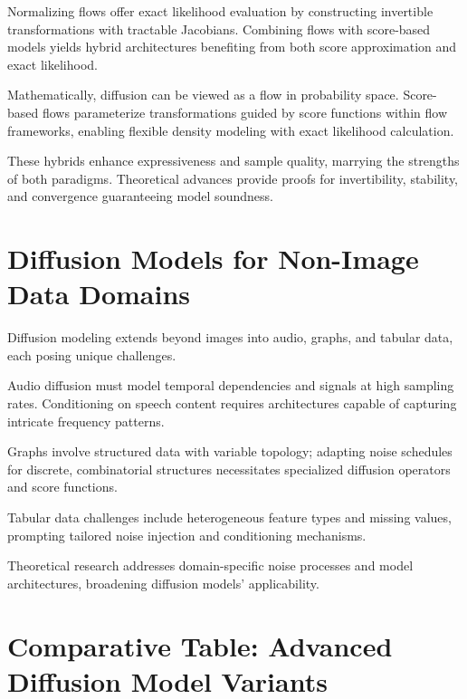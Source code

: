 \documentclass[a4paper,12pt,oneside]{memoir}
\begin{document}
Normalizing flows offer exact likelihood evaluation by constructing invertible transformations with tractable Jacobians. Combining flows with score-based models yields hybrid architectures benefiting from both score approximation and exact likelihood.

Mathematically, diffusion can be viewed as a flow in probability space. Score-based flows parameterize transformations guided by score functions within flow frameworks, enabling flexible density modeling with exact likelihood calculation.

These hybrids enhance expressiveness and sample quality, marrying the strengths of both paradigms. Theoretical advances provide proofs for invertibility, stability, and convergence guaranteeing model soundness.

\section{Diffusion Models for Non-Image Data Domains}

Diffusion modeling extends beyond images into audio, graphs, and tabular data, each posing unique challenges.

Audio diffusion must model temporal dependencies and signals at high sampling rates. Conditioning on speech content requires architectures capable of capturing intricate frequency patterns.

Graphs involve structured data with variable topology; adapting noise schedules for discrete, combinatorial structures necessitates specialized diffusion operators and score functions.

Tabular data challenges include heterogeneous feature types and missing values, prompting tailored noise injection and conditioning mechanisms.

Theoretical research addresses domain-specific noise processes and model architectures, broadening diffusion models' applicability.

\section{Comparative Table: Advanced Diffusion Model Variants}
\end{document}

